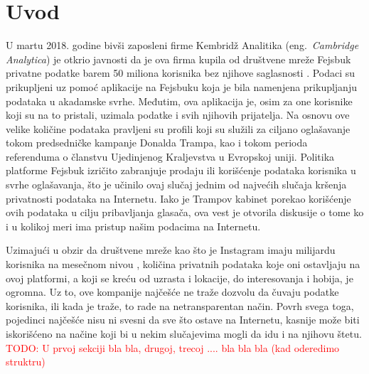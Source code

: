 \documentclass[a4paper]{article}
\newcommand\todos[1]{\textcolor{red}{#1}}
\begin{document}
\section{Uvod}
\label{sec:uvod}
\par U martu 2018. godine bivši zaposleni firme Kembridž Analitika (eng.~{\em Cambridge Analytica}) je otkrio javnosti da je ova firma kupila od društvene mreže Fejsbuk privatne podatke barem 50 miliona korisnika bez njihove saglasnosti \cite{guardian}. Podaci su prikupljeni uz pomoć aplikacije na Fejsbuku koja je bila namenjena prikupljanju podataka u akadamske svrhe. Međutim, ova aplikacija je, osim za one korisnike koji su na to pristali, uzimala podatke i svih njihovih prijatelja. Na osnovu ove velike količine podataka pravljeni su profili koji su služili za ciljano oglašavanje tokom predsedničke kampanje Donalda Trampa, kao i tokom perioda referenduma o članstvu Ujedinjenog Kraljevstva u Evropskoj uniji. Politika platforme Fejsbuk izričito zabranjuje prodaju ili korišćenje podataka korisnika u svrhe oglašavanja, što je učinilo ovaj slučaj jednim od najvećih slučaja kršenja privatnosti podataka na Internetu. Iako je Trampov kabinet porekao korišćenje ovih podataka u cilju pribavljanja glasača, ova vest je otvorila diskusije o tome ko i u kolikoj meri ima pristup našim podacima na Internetu.
\par Uzimajući u obzir da društvene mreže kao što je Instagram imaju milijardu korisnika na mesečnom nivou \cite{instagram} , količina privatnih podataka koje oni ostavljaju na ovoj platformi, a koji se kreću od uzrasta i lokacije, do interesovanja i hobija, je ogromna. Uz to, ove kompanije najčešće ne traže dozvolu da čuvaju podatke korisnika, ili kada je traže, to rade na netransparentan način. Povrh svega toga, pojedinci najčešće nisu ni svesni da sve što ostave na Internetu, kasnije može biti iskorišćeno na načine koji bi u nekim slučajevima mogli da idu i na njihovu štetu.
\todos{TODO: U prvoj sekciji bla bla, drugoj, trecoj .... bla bla bla (kad oderedimo struktru)}
\end{document}
